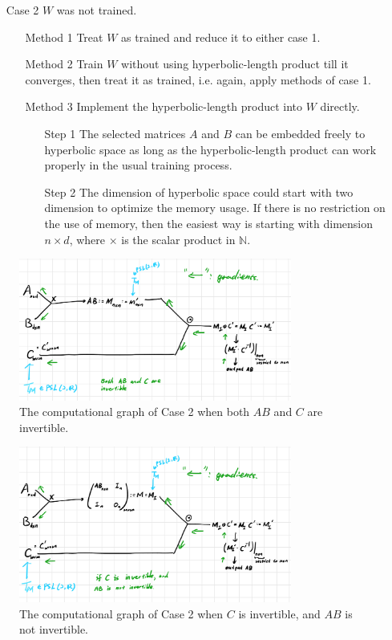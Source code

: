 \documentclass{article}
\theoremstyle{plain}
\theoremstyle{plain} %
\theoremstyle{definition}  %
\theoremstyle{remark}  %
\theoremstyle{plain}
\begin{document}
\begin{itemize}
\begin{itemize}
\item[Case 2] $W$ was not trained.
\begin{itemize}
\item[Method 1] Treat $W$ as trained and reduce it to either case 1.
\item[Method 2] Train $W$ without using hyperbolic-length product till it converges, then treat it as trained, i.e. again, apply methods of case 1.
\item[Method 3] Implement the hyperbolic-length product into $W$ directly.
\begin{itemize}
\item[Step 1] The selected matrices $A$ and $B$ can be embedded freely to hyperbolic space as long as the hyperbolic-length product can work properly in the usual training process.
\item[Step 2] The dimension of hyperbolic space could start with two dimension to optimize the memory usage. If there is no restriction on the use of memory, then the easiest way is starting with dimension $n\times d$, where $\times$ is the scalar product in $\mathbb{N}$.
\end{itemize}
\end{itemize}
\end{itemize}
\end{itemize} 


\begin{figure}[H]
\caption{The computational graph of Case 2 when both $AB$ and $C$ are invertible.}
\centering
\includegraphics[width=0.8\textwidth]{2.png}
\end{figure}

\begin{figure}[H]
\caption{The computational graph of Case 2 when $C$ is invertible, and $AB$ is not invertible.}
\centering
\includegraphics[width=0.8\textwidth]{3.png}
\end{figure}
\end{document}
